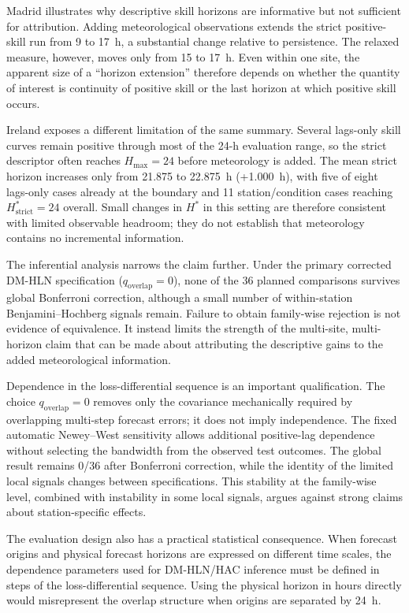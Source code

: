 \documentclass[pdflatex,sn-basic,iicol]{sn-jnl}
\begin{document}
Madrid illustrates why descriptive skill horizons are informative but not
sufficient for attribution. Adding meteorological observations extends the
strict positive-skill run from 9 to 17~h, a substantial change relative to
persistence. The relaxed measure, however, moves only from 15 to 17~h. Even
within one site, the apparent size of a ``horizon extension'' therefore
depends on whether the quantity of interest is continuity of positive skill
or the last horizon at which positive skill occurs.

Ireland exposes a different limitation of the same summary. Several lags-only
skill curves remain positive through most of the 24-h evaluation range, so
the strict descriptor often reaches $H_{\max}=24$ before meteorology is
added. The mean strict horizon increases only from 21.875 to 22.875~h
(+1.000~h), with five of eight lags-only cases already at the boundary and 11
station/condition cases reaching $H^*_{\text{strict}}=24$ overall. Small
changes in $H^*$ in this setting are therefore consistent with limited
observable headroom; they do not establish that meteorology contains no
incremental information.

The inferential analysis narrows the claim further. Under the primary
corrected DM-HLN specification ($q_{\text{overlap}}=0$), none of the 36
planned comparisons survives global Bonferroni correction, although a small
number of within-station Benjamini--Hochberg signals remain. Failure to obtain
family-wise rejection is not evidence of equivalence. It instead limits the
strength of the multi-site, multi-horizon claim that can be made about
attributing the descriptive gains to the added meteorological information.

Dependence in the loss-differential sequence is an important qualification.
The choice $q_{\text{overlap}}=0$ removes only the covariance mechanically
required by overlapping multi-step forecast errors; it does not imply
independence. The fixed automatic Newey--West sensitivity allows additional
positive-lag dependence without selecting the bandwidth from the observed
test outcomes. The global result remains 0/36 after Bonferroni correction,
while the identity of the limited local signals changes between
specifications. This stability at the family-wise level, combined with
instability in some local signals, argues against strong claims about
station-specific effects.

The evaluation design also has a practical statistical consequence. When
forecast origins and physical forecast horizons are expressed on different
time scales, the dependence parameters used for DM-HLN/HAC inference must be
defined in steps of the loss-differential sequence. Using the physical
horizon in hours directly would misrepresent the overlap structure when
origins are separated by 24~h.
\end{document}
